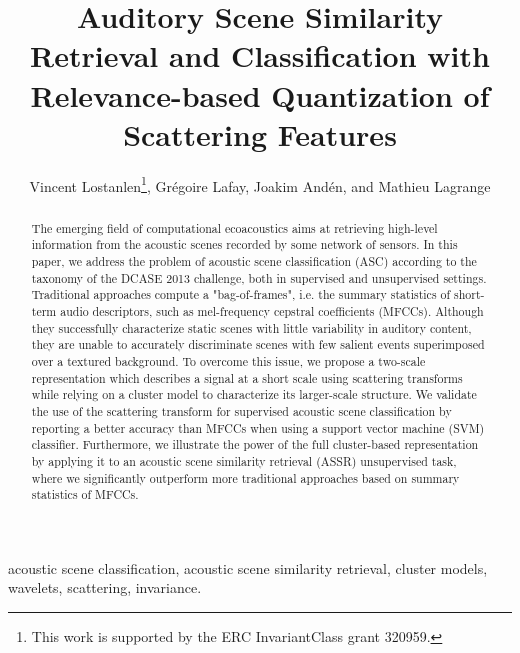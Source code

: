 \documentclass[journal]{IEEEtran}
\begin{document}
%
\title{Auditory Scene Similarity Retrieval and Classification with Relevance-based Quantization of Scattering Features}

\author{Vincent Lostanlen\thanks{This work is supported by the ERC InvariantClass grant 320959.}, Gr\'egoire Lafay, Joakim And\'en, and Mathieu Lagrange}


\maketitle

\begin{abstract}
The emerging field of computational ecoacoustics aims at retrieving high-level information from the acoustic scenes recorded by some network of sensors.
In this paper, we address the problem of acoustic scene classification (ASC) according to the taxonomy of the DCASE 2013 challenge, both in supervised and unsupervised settings.
Traditional approaches compute a "bag-of-frames", i.e. the summary statistics of short-term audio descriptors, such as mel-frequency cepstral coefficients (MFCCs).
Although they successfully characterize static scenes with little variability in auditory content, they are unable to accurately discriminate scenes with few salient events superimposed over a textured background.
To overcome this issue, we propose a two-scale representation which describes a signal at a short scale using scattering transforms while relying on a cluster model to characterize its larger-scale structure.
We validate the use of the scattering transform for supervised acoustic scene classification by reporting a better accuracy than MFCCs when using a support vector machine (SVM) classifier.
Furthermore, we illustrate the power of the full cluster-based representation by applying it to an acoustic scene similarity retrieval (ASSR) unsupervised task, where we significantly outperform more traditional approaches based on summary statistics of MFCCs.
\end{abstract}

\begin{IEEEkeywords}
acoustic scene classification, acoustic scene similarity retrieval, cluster models, wavelets, scattering, invariance.
\end{IEEEkeywords}
\end{document}

